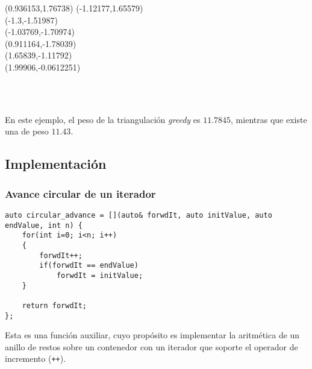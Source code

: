 \documentclass[compress]{beamer}
\begin{document}
\begin{frame}{}
\begin{columns}[c] 

(0.936153,1.76738)
(-1.12177,1.65579)\\
(-1.3,-1.51987)\\
(-1.03769,-1.70974)\\
(0.911164,-1.78039)\\
(1.65839,-1.11792)\\
(1.99906,-0.0612251)

    \end{columns}
\hfill\\
\hfill\\
En este ejemplo, el peso de la triangulación \textit{greedy} es $11.7845$, mientras que existe una de peso $11.43$.
\end{frame}


\subsection{Implementación}
\begin{frame}[fragile]
	\frametitle{Avance circular de un iterador}
 \begin{lstlisting}
auto circular_advance = [](auto& forwdIt, auto initValue, auto endValue, int n) {
	for(int i=0; i<n; i++)
	{
		forwdIt++;
		if(forwdIt == endValue)
			forwdIt = initValue;
	}

	return forwdIt;
};
 \end{lstlisting}
 
Esta es una función auxiliar, cuyo propósito es implementar la aritmética de un anillo de restos sobre un contenedor con un iterador que soporte el operador de incremento (\texttt{++}).
 
\end{frame}
\end{document}
